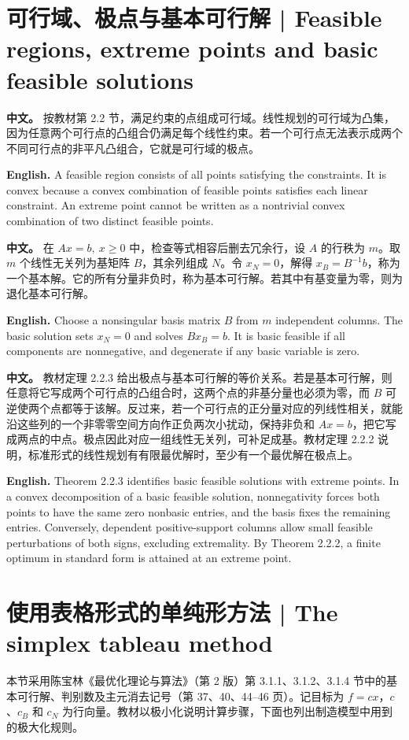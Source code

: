\documentclass[UTF8,11pt,a4paper]{ctexart}
\newcommand{\APS}[2]{\par\noindent\textbf{中文。} #1\par\noindent\textbf{English.} #2\par\smallskip}
\begin{document}
\section{可行域、极点与基本可行解 | Feasible regions, extreme points and basic feasible solutions}
\APS{按教材第 2.2 节，满足约束的点组成可行域。线性规划的可行域为凸集，因为任意两个可行点的凸组合仍满足每个线性约束。若一个可行点无法表示成两个不同可行点的非平凡凸组合，它就是可行域的极点。}{A feasible region consists of all points satisfying the constraints. It is convex because a convex combination of feasible points satisfies each linear constraint. An extreme point cannot be written as a nontrivial convex combination of two distinct feasible points.}
\APS{在 $Ax=b,\ x\ge0$ 中，检查等式相容后删去冗余行，设 $A$ 的行秩为 $m$。取 $m$ 个线性无关列为基矩阵 $B$，其余列组成 $N$。令 $x_N=0$，解得 $x_B=B^{-1}b$，称为一个基本解。它的所有分量非负时，称为基本可行解。若其中有基变量为零，则为退化基本可行解。}{Choose a nonsingular basis matrix $B$ from $m$ independent columns. The basic solution sets $x_N=0$ and solves $Bx_B=b$. It is basic feasible if all components are nonnegative, and degenerate if any basic variable is zero.}
\APS{教材定理 2.2.3 给出极点与基本可行解的等价关系。若是基本可行解，则任意将它写成两个可行点的凸组合时，这两个点的非基分量也必须为零，而 $B$ 可逆使两个点都等于该解。反过来，若一个可行点的正分量对应的列线性相关，就能沿这些列的一个非零零空间方向作正负两次小扰动，保持非负和 $Ax=b$，把它写成两点的中点。极点因此对应一组线性无关列，可补足成基。教材定理 2.2.2 说明，标准形式的线性规划有有限最优解时，至少有一个最优解在极点上。}{Theorem 2.2.3 identifies basic feasible solutions with extreme points. In a convex decomposition of a basic feasible solution, nonnegativity forces both points to have the same zero nonbasic entries, and the basis fixes the remaining entries. Conversely, dependent positive-support columns allow small feasible perturbations of both signs, excluding extremality. By Theorem 2.2.2, a finite optimum in standard form is attained at an extreme point.}

\section{使用表格形式的单纯形方法 | The simplex tableau method}
\noindent 本节采用陈宝林《最优化理论与算法》（第 2 版）第 3.1.1、3.1.2、3.1.4 节中的基本可行解、判别数及主元消去记号（第 37、40、44--46 页）。记目标为 $f=cx$，$c$、$c_B$ 和 $c_N$ 为行向量。教材以极小化说明计算步骤，下面也列出制造模型中用到的极大化规则。
\end{document}
